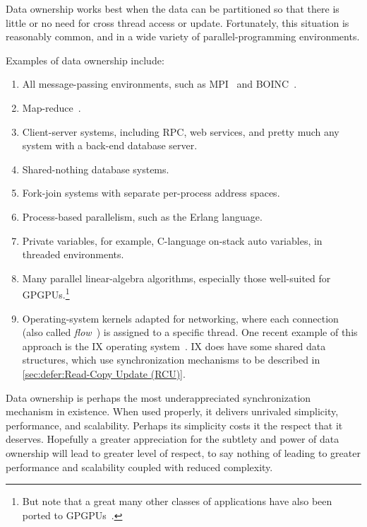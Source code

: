 Data ownership works best when the data can be partitioned so that there
is little or no need for cross thread access or update.
Fortunately, this situation is reasonably common, and in a wide variety
of parallel-programming environments.

Examples of data ownership include:

\begin{enumerate}
\item	All message-passing environments, such as MPI~\cite{MPIForum2008}
	and BOINC~\cite{BOINC2008}.
\item	Map-reduce~\cite{MapReduce2008MIT}.
\item	Client-server systems, including RPC, web services, and
	pretty much any system with a back-end database server.
\item	Shared-nothing database systems.
\item	Fork-join systems with separate per-process address spaces.
\item	Process-based parallelism, such as the Erlang language.
\item	Private variables, for example, C-language on-stack auto variables,
	in threaded environments.
\item	Many parallel linear-algebra algorithms, especially those
	well-suited for GPGPUs.\footnote{
		But note that a great many other classes of applications
		have also been ported to
		GPGPUs~\cite{NormMatloff2017ParProcBook,AMD2020ROCm,NVidia2017GPGPU,NVidia2017GPGPU-university}.}
\item	Operating-system kernels adapted for networking, where each connection
	(also called \emph{flow}~\cite{Shenker89,ZhangPhD,McKenney90})
	is assigned to a specific thread.
	One recent example of this approach is the IX operating
	system~\cite{Belay:2016:IOS:3014162.2997641}.
	IX does have some shared data structures, which use synchronization
	mechanisms to be described in
	\cref{sec:defer:Read-Copy Update (RCU)}.
\end{enumerate}

Data ownership is perhaps the most underappreciated synchronization
mechanism in existence.
When used properly, it delivers unrivaled simplicity, performance,
and scalability.
Perhaps its simplicity costs it the respect that it deserves.
Hopefully a greater appreciation for the subtlety and power of data ownership
will lead to greater level of respect, to say nothing of leading to
greater performance and scalability coupled with reduced complexity.


